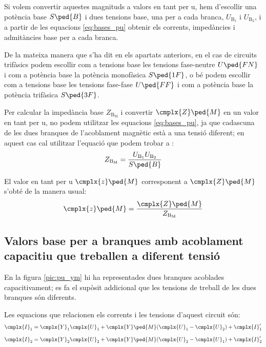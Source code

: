 Si volem convertir aquestes magnituds a valors en tant per u, hem d'escollir  una potència base $S\ped{B}$ i dues tensions base, una  per a cada branca, $U_{\text{B}_1}$ i  $U_{\text{B}_2}$, i a partir de les equacions \eqref{eq:bases_pu} obtenir els corrents, impedàncies i admitàncies base per a cada branca.

De la mateixa manera que s'ha dit en els apartats anteriors, en el cas de circuits trifàsics podem escollir com a tensions base les tensions fase-neutre $U\ped{FN}$ i com a potència base la potència  monofàsica $S\ped{1F}$, o bé podem escollir com a tensions base les tensions fase-fase $U\ped{FF}$ i com a potència base la potència trifàsica $S\ped{3F}$.


Per calcular la impedància base $Z_{\text{B}_\text{M}}$ i convertir $\cmplx{Z}\ped{M}$ en un valor en tant per u, no podem utilitzar les equacions \eqref{eq:bases_pu}, ja que cadascuna de les dues branques de l'acoblament magnètic està a una tensió diferent; en aquest cas cal utilitzar l'equació que podem trobar a \cite{TLE}:
\begin{equation}
    Z_{\text{B}_\text{M}} = \frac{U_{\text{B}_1} U_{\text{B}_2}} {S\ped{B}}
\end{equation}

El valor en tant per u $\cmplx{z}\ped{M}$ corresponent a $\cmplx{Z}\ped{M}$ s'obté de la manera usual:
\begin{equation}
    \cmplx{z}\ped{M} = \frac{\cmplx{Z}\ped{M}}{Z_{\text{B}_\text{M}}}
\end{equation}


\subsection{Valors base per a branques amb acoblament capacitiu que treballen a diferent tensió}

En la figura \vref{pic:pu_ym} hi ha representades dues branques acoblades capacitivament; es fa el supòsit addicional que les tensions de treball de les dues branques són diferents.

\begin{center}
    
    \label{pic:pu_ym}
\end{center}

Les equacions que relacionen els corrents i les tensions d'aquest circuit són:
\begin{subequations}
\begin{align}
    \cmplx{I}_1  &= \cmplx{Y}_1 \cmplx{U}_1 +  \cmplx{Y}\ped{M}(\cmplx{U}_1-\cmplx{U}_2)  + \cmplx{I}'_1   \\[2mm]
    \cmplx{I}_2  &= \cmplx{Y}_2 \cmplx{U}_2 +  \cmplx{Y}\ped{M}(\cmplx{U}_2-\cmplx{U}_1)  + \cmplx{I}'_2
\end{align}
\end{subequations}


